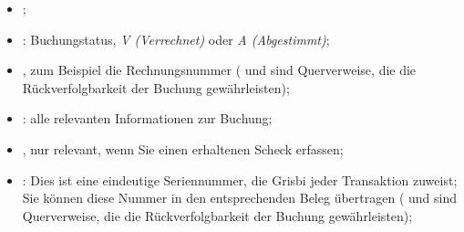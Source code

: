 \begin{itemize}
	\item {};
	\item {}: Buchungstatus, \emph{V (Verrechnet)} oder \emph{A (Abgestimmt)};
	\item {}, zum Beispiel die Rechnungsnummer ( und  sind Querverweise, die die Rückverfolgbarkeit der Buchung gewährleisten);
	\item {}: alle relevanten Informationen zur Buchung;
	\item {}, nur relevant, wenn Sie einen erhaltenen Scheck erfassen;
	\item {}: Dies ist eine eindeutige Seriennummer, die Grisbi jeder Transaktion zuweist; Sie können diese Nummer in den entsprechenden Beleg übertragen ( und  sind Querverweise, die die Rückverfolgbarkeit der Buchung gewährleisten);

\end{itemize}
